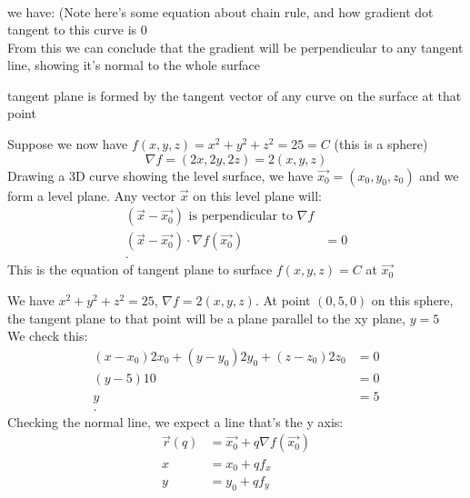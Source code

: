 \begin{itemize}
\begin{example}
\begin{align*}
	\end{align*}
	we have: (Note here's some equation about chain rule, and how gradient dot tangent to this curve is 0\\
	From this we can conclude that the gradient will be perpendicular to any tangent line, showing it's normal to the whole surface\\
\end{example}
\begin{idea}
	tangent plane is formed by the tangent vector of any curve on the surface at that point
\end{idea}
\begin{example}
	Suppose we now have $f\left( x,y, z\right)=x^2+y^2+z^2 = 25 = C $ (this is a sphere)
	\begin{equation}
		\nabla f = \left( 2x,2y,2z \right) = 2\left( x,y,z \right) 
	\end{equation}
	Drawing a 3D curve showing the level surface, we have $\vec{x_0} = \left( x_0,y_0,z_0 \right) $ and we form a level plane. Any vector $\vec{x}$ on this level plane will:
	\begin{align*}
		\left( \vec{x}-\vec{x_0} \right) \text{ is perpendicular to }\nabla f\\
		\left( \vec{x} -\vec{x_0}\right) \cdot \nabla f\left( \vec{x_0} \right)  &= 0 \\
	.\end{align*}
	This is the equation of tangent plane to surface $f\left( x,y,z \right)  = C$ at $\vec{x_0}$
\end{example}
\begin{example}
	We have $x^2+y^2+z^2=25$, $\nabla f = 2\left( x,y,z \right) $. At point $\left( 0,5,0 \right) $ on this sphere, the tangent plane to that point will be a plane parallel to the xy plane, $y=5$\\
	We check this:
	 \begin{align*}
		 \left( x-x_0 \right) 2x_0 + \left( y-y_0 \right) 2y_0 + \left( z-z_0 \right) 2z_0 &=  0 \\
		 \left( y-5 \right) 10 &= 0 \\
		 y&= 5 \\
	.\end{align*}
	Checking the normal line, we expect a line that's the y axis:
	\begin{align*}
		\vec{r}(q) &= \vec{x_0} + q \nabla f\left( \vec{x_0} \right)  \\
		x &=  x_0 + qf_x \\
		y &= y_0 + qf_y \\

\end{align*}
\end{example}
\end{itemize}
